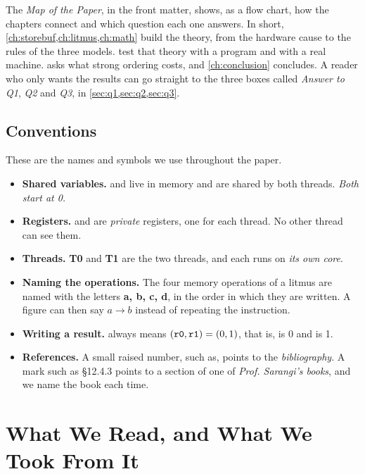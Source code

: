 The \emph{Map of the Paper}, in the front matter, shows, as a flow chart, how the chapters connect and which question each one answers. In short, \cref{ch:storebuf,ch:litmus,ch:math} build the theory, from the hardware cause to the rules of the three models.  test that theory with a program and with a real machine.  asks what strong ordering costs, and \cref{ch:conclusion} concludes. A reader who only wants the results can go straight to the three boxes called \emph{Answer to Q1}, \emph{Q2} and \emph{Q3}, in \cref{sec:q1,sec:q2,sec:q3}.

\section{Conventions}
\label{sec:conventions}

These are the names and symbols we use throughout the paper.
\begin{itemize}
\item \textbf{Shared variables.}  and  live in memory and are shared by both threads. \emph{Both start at 0.}
\item \textbf{Registers.}  and  are \emph{private} registers, one for each thread. No other thread can see them.
\item \textbf{Threads.} \textbf{T0} and \textbf{T1} are the two threads, and each runs on \emph{its own core}.
\item \textbf{Naming the operations.} The four memory operations of a \gls{litmus} are named with the letters \textbf{a, b, c, d}, in the order in which they are written. A figure can then say $a \to b$ instead of repeating the instruction.
\item \textbf{Writing a result.}  always means $(\texttt{r0}, \texttt{r1}) = (0, 1)$, that is,  is 0 and  is 1.
\item \textbf{References.} A small raised number, such as\cite{lamport1979how}, points to the \emph{bibliography}. A mark such as \S12.4.3 points to a section of one of \emph{Prof. Sarangi's books}, and we name the book each time.
\end{itemize}

\chapter{What We Read, and What We Took From It}
\label{ch:reading}

